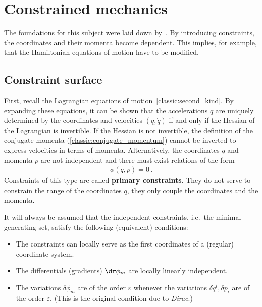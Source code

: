 \chapter{Constrained mechanics}\label{chapter:constrained_dynamics}

    The foundations for this subject were laid down by~\citet{dirac_generalized_1950}. By introducing constraints, the coordinates and their momenta become dependent. This implies, for example, that the Hamiltonian equations of motion have to be modified.

    \minitoc

\section{Constraint surface}

    First, recall the Lagrangian equations of motion~\eqref{classic:second_kind}. By expanding these equations, it can be shown that the accelerations $\ddot{q}$ are uniquely determined by the coordinates and velocities $(q,\dot{q})$ if and only if the Hessian of the Lagrangian is invertible. If the Hessian is not invertible, the definition of the conjugate momenta (\cref{classic:conjugate_momentum}) cannot be inverted to express velocities in terms of momenta. Alternatively, the coordinates $q$ and momenta $p$ are not independent and there must exist relations of the form
    \begin{gather}
        \phi(q,p) = 0\,.
    \end{gather}
    Constraints of this type are called \textbf{primary constraints}. They do not serve to constrain the range of the coordinates $q$, they only couple the coordinates and the momenta.

    \begin{axiom}\label{constraint:regularity}
        It will always be assumed that the independent constraints, i.e.~the minimal generating set, satisfy the following (equivalent) conditions:
        \begin{itemize}
            \item The constraints can locally serve as the first coordinates of a (regular) coordinate system.
            \item The differentials (gradients) $\dr\phi_m$ are locally linearly independent.
            \item The variations $\delta\phi_m$ are of the order $\varepsilon$ whenever the variations $\delta q^i,\delta p_i$ are of the order $\varepsilon$. (This is the original condition due to \textit{Dirac}.)
        \end{itemize}
    \end{axiom}

